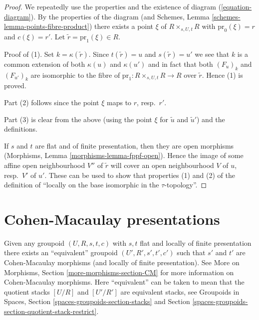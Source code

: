 \begin{proof}
We repeatedly use the properties and the existence of
diagram (\ref{equation-diagram}).
By the properties of the diagram (and
Schemes, Lemma \ref{schemes-lemma-points-fibre-product})
there exists a point $\xi$ of $R \times_{s, U, t} R$
with $\text{pr}_0(\xi) = r$ and $c(\xi) = r'$.
Let $\tilde r = \text{pr}_1(\xi) \in R$.

\medskip\noindent
Proof of (1). Set $k = \kappa(\tilde r)$. Since $t(\tilde r) = u$
and $s(\tilde r) = u'$ we see that $k$ is a common extension
of both $\kappa(u)$ and $\kappa(u')$ and in fact that
both $(F_u)_k$ and $(F_{u'})_k$ are isomorphic to the fibre of
$\text{pr}_1 : R \times_{s, U, t} R \to R$ over $\tilde r$.
Hence (1) is proved.

\medskip\noindent
Part (2) follows since the point $\xi$ maps to $r$, resp.\ $r'$.

\medskip\noindent
Part (3) is clear from the above (using the point $\xi$ for
$\tilde u$ and $\tilde u'$) and the definitions.

\medskip\noindent
If $s$ and $t$ are flat and of finite presentation, then
they are open morphisms (Morphisms, Lemma \ref{morphisms-lemma-fppf-open}).
Hence the image of some affine open neighbourhood $V''$ of $\tilde r$ will
cover an open neighbourhood $V$ of $u$, resp.\ $V'$ of $u'$.
These can be used to show that properties (1) and (2) of the
definition of ``locally on the base isomorphic in the
$\tau$-topology''.
\end{proof}







\section{Cohen-Macaulay presentations}
\label{section-CM}

\noindent
Given any groupoid $(U, R, s, t, c)$ with $s, t$ flat and
locally of finite presentation there exists an ``equivalent''
groupoid $(U', R', s', t', c')$ such that $s'$ and $t'$ are
Cohen-Macaulay morphisms (and locally of finite presentation). See
More on Morphisms, Section \ref{more-morphisms-section-CM}
for more information on Cohen-Macaulay morphisms.
Here ``equivalent'' can be taken to mean that the quotient stacks
$[U/R]$ and $[U'/R']$ are equivalent stacks, see
Groupoids in Spaces, Section \ref{spaces-groupoids-section-stacks}
and Section \ref{spaces-groupoids-section-quotient-stack-restrict}.

